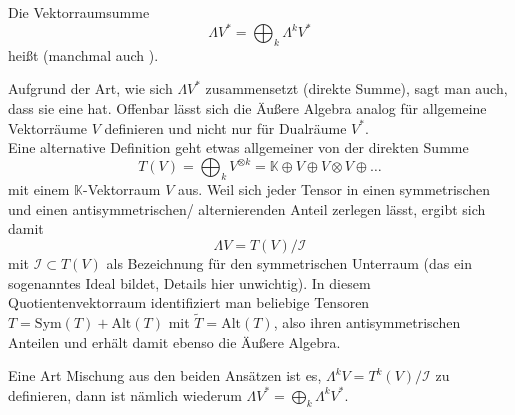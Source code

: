 \documentclass[../H_Analysis_main.tex]{subfiles}
\begin{document}
\begin{defi}
Die Vektorraumsumme
\begin{equation}
\Lambda V^* = \bigoplus_k \Lambda^k V^*
\end{equation}
heißt  (manchmal auch ).
\end{defi}

Aufgrund der Art, wie sich $\Lambda V^*$ zusammensetzt (direkte Summe), sagt man auch, dass sie eine  hat. Offenbar lässt sich die Äußere Algebra analog für allgemeine Vektorräume $V$ definieren und nicht nur für Dualräume $V^*$.\\


Eine alternative Definition geht etwas allgemeiner von der direkten Summe
\begin{equation*}
T(V) = \bigoplus_k V^{\otimes k} = \mathbb{K} \oplus V \oplus V \otimes V \oplus \dots
\end{equation*}
mit einem $\mathbb{K}$-Vektorraum $V$ aus. Weil sich jeder Tensor in einen symmetrischen und einen antisymmetrischen/ alternierenden Anteil zerlegen lässt, ergibt sich damit
\begin{equation}
\Lambda V = T(V)/ \mathcal{I}
\end{equation}
mit $\mathcal{I} \subset T(V)$ als Bezeichnung für den symmetrischen Unterraum (das ein sogenanntes Ideal bildet, Details hier unwichtig). In diesem Quotientenvektorraum identifiziert man beliebige Tensoren $T = \text{Sym}(T) + \text{Alt}(T)$ mit $\tilde{T} = \text{Alt}(T)$, also ihren antisymmetrischen Anteilen und erhält damit ebenso die Äußere Algebra.

Eine Art Mischung aus den beiden Ansätzen ist es, $\Lambda^k V = T^k(V)/ \mathcal{I}$ zu definieren, dann ist nämlich wiederum $\Lambda V^* = \bigoplus_k \Lambda^k V^*$.




\newpage
\end{document}
